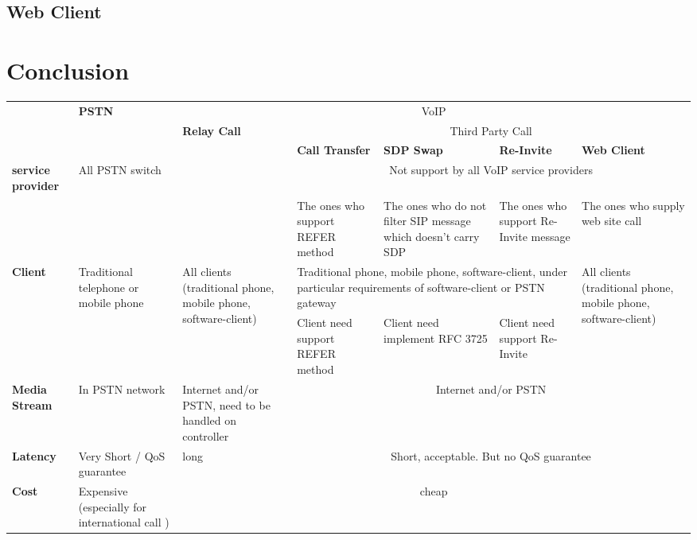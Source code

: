 \subsection{Web Client}
\label{sec:Solution:ThirdPartyCall:WebClient}



\section{Conclusion}
\label{sec:Solution:Conclusion}

\begin{tabular}{|p{0.60in}|p{0.60in}|p{0.65in}|p{0.65in}|p{0.65in}|p{0.65in}|p{0.65in}|}
\hline
        & \multirow{3}{0.65in}{\textbf{PSTN}} &\multicolumn{5}{c|}{VoIP} \\ \cline{3-7}
        &               & \multirow{3}{0.65in}{\textbf{Relay Call}} &\multicolumn{4}{c|}{Third Party Call} \\ \cline{4-7}
 		  &               &                    & \textbf{Call Transfer} &\textbf{SDP Swap} &\textbf{Re-Invite} &\textbf{Web Client} \\\cline{1-7}	
\textbf{service provider} & All PSTN switch & \multirow{2}{0.65in}{support by all VoIP service providers} & \multicolumn{4}{c|}{Not support by all VoIP service providers}\\ \cline{4-7}
& & & The ones who support REFER method & The ones who do not filter SIP message which doesn't carry SDP & The ones who support
Re-Invite message & The ones who supply web site call \\ \cline{1-7}

\textbf{Client} & \multirow{2}{0.65in}{Traditional telephone or mobile phone} &\multirow{2}{0.65in}{All clients (traditional phone, mobile phone, software-client)} & \multicolumn{3}{p{1.95in}|}{Traditional phone, mobile phone, software-client, under particular requirements of software-client or PSTN gateway} & \multirow{2}{0.65in}{All clients (traditional phone, mobile phone, software-client)} \\ \cline{4-6}
& & & Client need support REFER method  & Client need implement RFC 3725 & Client need support Re-Invite & \\ \cline{1-7}
\textbf{Media Stream} & In PSTN network & Internet and/or PSTN, need to be handled on controller & \multicolumn{4}{c|}{Internet and/or PSTN}\\ \cline{1-7}
\textbf{Latency} & Very Short / QoS guarantee & long & \multicolumn{4}{c|}{Short, acceptable. But no QoS guarantee} \\ \cline{1-7}
\textbf{Cost} & Expensive (especially for international call ) & \multicolumn{5}{c|}{cheap} \\

\hline
\end{tabular}

